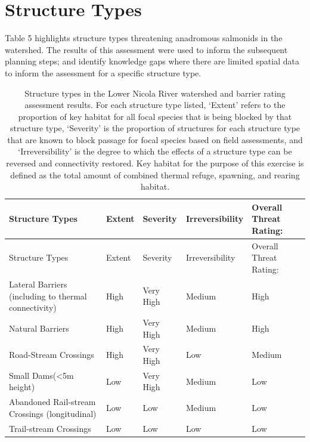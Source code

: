 \documentclass[
  letterpaper,
  DIV=11,
  numbers=noendperiod]{scrreprt}
\begin{document}
\hypertarget{structure-types}{%
\section*{Structure Types}\label{structure-types}}


Table 5 highlights structure types threatening anadromous salmonids in
the watershed. The results of this assessment were used to inform the
subsequent planning steps; and identify knowledge gaps where there are
limited spatial data to inform the assessment for a specific structure
type.

\hypertarget{tbl-barriertype}{}
\begin{longtable}[]{@{}lllll@{}}
\caption{\label{tbl-barriertype}Structure types in the Lower Nicola
River watershed and barrier rating assessment results. For each
structure type listed, `Extent' refers to the proportion of key habitat
for all focal species that is being blocked by that structure type,
`Severity' is the proportion of structures for each structure type that
are known to block passage for focal species based on field assessments,
and `Irreversibility' is the degree to which the effects of a structure
type can be reversed and connectivity restored. Key habitat for the
purpose of this exercise is defined as the total amount of combined
thermal refuge, spawning, and rearing
habitat.}\label{T_a42f4}\tabularnewline
\toprule\noalign{}
Structure Types & Extent & Severity & Irreversibility & Overall Threat
Rating: \\
\midrule\noalign{}
\endfirsthead
\toprule\noalign{}
Structure Types & Extent & Severity & Irreversibility & Overall Threat
Rating: \\
\midrule\noalign{}
\endhead
\bottomrule\noalign{}
\endlastfoot
Lateral Barriers (including to thermal connectivity) & High & Very High
& Medium & High \\
Natural Barriers & High & Very High & Medium & High \\
Road-Stream Crossings & High & Very High & Low & Medium \\
Small Dams(\textless5m height) & Low & Very High & Medium & Low \\
Abandoned Rail-stream Crossings (longitudinal) & Low & Low & Medium &
Low \\
Trail-stream Crossings & Low & Low & Low & Low \\
\end{longtable}
\end{document}
